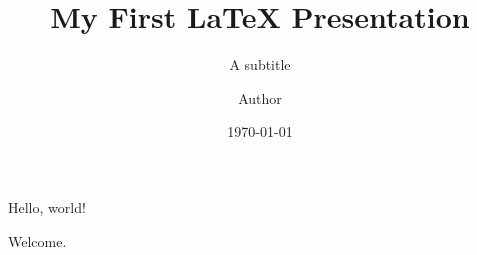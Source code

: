 \documentclass{beamer}
\title{My First \LaTeX{} Presentation}
\subtitle{A subtitle}
\author{Author}
\date{\today}
\begin{document}
\begin{frame}[plain]
    \titlepage
\end{frame}

\begin{frame}
    Hello, world!

	Welcome.
\end{frame}
\end{document}
